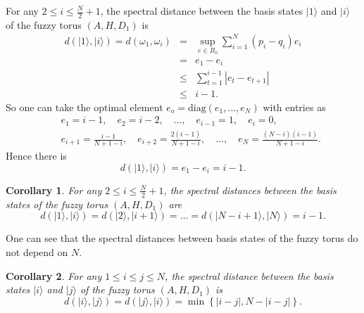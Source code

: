 \documentclass[a4paper,11pt]{article}
\newtheorem{corollary}{Corollary}
\begin{document}
For any $2 \leqslant i \leqslant \frac{N}{2} + 1$, the spectral distance
between the basis states $|1 \rangle$ and $|i \rangle$ of the fuzzy
torus $(A, H, D_1)$ is
\begin{eqnarray}
  d (|1 \rangle, |i \rangle) = d (\omega_1, \omega_i) & = & \sup_{e \in B_o}
  \sum_{i = 1}^N (p_i - q_i) e_i \nonumber\\
  & = & e_1 - e_i  \nonumber\\
  & \leqslant & \sum_{t = 1}^{i - 1} |e_t - e_{t + 1} | \nonumber\\
  & \leqslant & i - 1. 
\end{eqnarray}
So one can take the optimal element $e_o = \mathrm{diag} (e_1, \ldots, e_N)$
with entries as
\begin{eqnarray}
&&  e_1 =  i - 1, \quad e_2 = i - 2, \quad
  \ldots, \quad e_{i - 1} = 1 , \quad e_i = 0,
\nonumber\\
&&  e_{i + 1} = \frac{i - 1}{N + 1 - i}, \quad e_{i + 2} =
  \frac{2 (i - 1)}{N + 1 - i}, \quad \ldots, \quad e_N =
  \frac{(N - i)  (i - 1)}{N + 1 - i} .
\end{eqnarray}
Hence there is
\begin{equation}
  d (|1 \rangle, |i \rangle) = e_1 - e_i = i - 1.
\end{equation}
\begin{corollary}
  For any $2 \leqslant i \leqslant \frac{N}{2} + 1$, the spectral distances
  between the basis states of the fuzzy torus $(A, H, D_1)$ are
  \begin{equation}
    d (|1 \rangle, |i \rangle) = d (|2 \rangle, |i + 1 \rangle) = \ldots = d
    (|N - i + 1 \rangle, |N \rangle) = i - 1.
  \end{equation}
\end{corollary}

One can see that the spectral distances between basis states of
the fuzzy torus do not depend on $N$.

\begin{corollary}
  For any $1 \leqslant i \leqslant j \leqslant N$, the spectral distance between the basis states
  $|i \rangle$ and $|j \rangle$ of the fuzzy torus $(A, H, D_1)$ is
  \begin{equation}\label{ij}
    d (|i \rangle, |j \rangle) = d (|j \rangle, |i \rangle) = \min \left\{ |i - j|, N - |i - j| \right\}.
  \end{equation}
\end{corollary}
\end{document}
